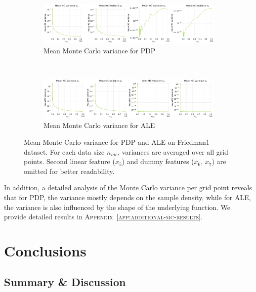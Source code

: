 \documentclass[runningheads]{llncs}
\begin{document}
\begin{figure}[h!]
    \centering
    \begin{subfigure}[b]{\textwidth}
        \centering
        \includegraphics[width=\textwidth]{img/mean_mc_variance_friedman1_pdp.png}
        \caption{Mean Monte Carlo variance for PDP}
        \label{fig:mc-variance-pdp}  %
    \end{subfigure}
    \\[10pt]
    \vfill
    \begin{subfigure}[b]{\textwidth}
        \centering
        \includegraphics[width=\textwidth]{img/mean_mc_variance_friedman1_ale.png}
        \caption{Mean Monte Carlo variance for ALE}
        \label{fig:mc-variance-ale}  %
    \end{subfigure}
    \caption{Mean Monte Carlo variance for PDP and ALE on Friedman1 dataset.
    For each data size $n_{mc}$, variances are averaged over all grid points.
    Second linear feature ($x_5$) and dummy features ($x_6$, $x_7$) are omitted for better readability.}
    \label{fig:mc-variance}  %
\end{figure}

In addition, a detailed analysis of the Monte Carlo variance per grid point reveals that for PDP,
the variance mostly depends on the sample density, while for ALE, the variance is also influenced by the
shape of the underlying function. We provide detailed results in \textsc{Appendix~\ref{app:additional-mc-results}}.


\clearpage
\section{Conclusions}\label{sec:conclusion}

\subsection{Summary \& Discussion}
\end{document}
